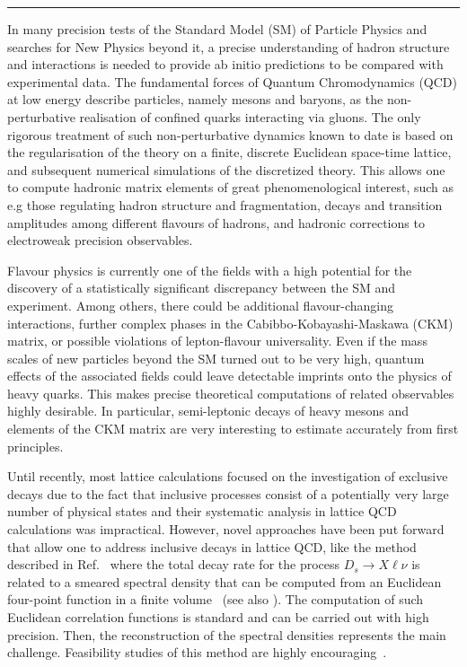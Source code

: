\rule{\textwidth}{0.4pt}

In many precision tests of the Standard Model (SM) of Particle Physics and
searches for New Physics beyond it, a precise understanding of hadron
structure and interactions is needed to provide ab initio predictions
to be compared with experimental data. The fundamental forces of Quantum
Chromodynamics (QCD) at low energy describe particles, namely mesons and
baryons, as the non-perturbative realisation of confined quarks interacting
via gluons. The only rigorous treatment of such non-perturbative
dynamics known to date is based on the regularisation of the theory on
a finite, discrete Euclidean space-time lattice, and subsequent
numerical simulations of the discretized theory. This allows one to
compute hadronic matrix elements of great phenomenological interest,
such as e.g those regulating hadron structure and fragmentation, decays and transition
amplitudes among different flavours of hadrons, and hadronic corrections
to electroweak precision observables.

Flavour physics is currently one of the fields with a high potential
for the discovery of a statistically significant discrepancy between the SM and
experiment. Among others, there could be additional flavour-changing
interactions, further complex phases in the Cabibbo-Kobayashi-Maskawa (CKM)
matrix, or possible violations 
of lepton-flavour universality. Even if the mass scales of new
particles beyond the SM turned out to be very high, quantum effects of
the associated fields could leave detectable imprints onto the physics
of heavy quarks.
This makes precise theoretical computations of related observables
highly desirable. In particular, semi-leptonic decays of heavy mesons
and elements of the CKM matrix are very
interesting to estimate accurately from first principles.

Until recently, most lattice calculations focused on the investigation
of exclusive decays due to the fact that inclusive processes consist
of a potentially very large number of physical states and their
systematic analysis in lattice QCD calculations was impractical.  
However, novel approaches have been put forward that allow one to address
inclusive decays in lattice QCD, like the method described in 
Ref.~\cite{Gambino:2020crt} where the total decay rate for the process
$D_s \to X\ell\nu$ is related to a smeared spectral density that can
be computed from an Euclidean four-point function in a finite
volume~\cite{Hansen:2019idp} (see
also \cite{Bulava:2019kbi,Bulava:2021fre}). The computation of such
Euclidean correlation functions is standard and can be carried out
with high precision. Then, the reconstruction of the spectral densities
represents the main challenge. Feasibility studies of this
method are highly encouraging~\cite{Gambino:2022dvu}.

